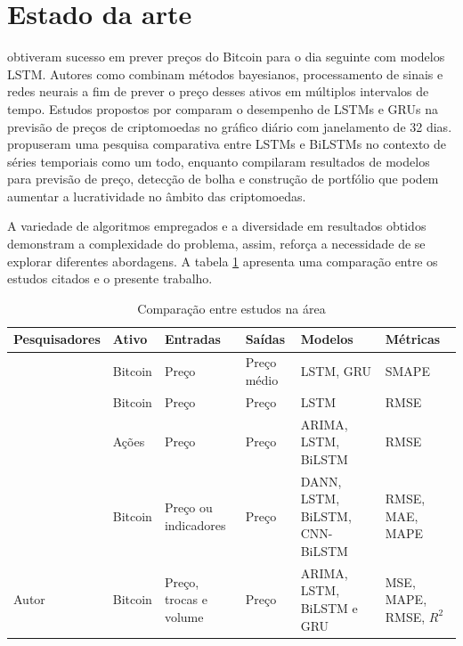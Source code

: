 
\section{Estado da arte} \label{sec:estado}

\textcite{Fer} obtiveram sucesso em prever preços do Bitcoin para o dia seguinte com modelos LSTM. Autores como \textcite{Tri} combinam métodos bayesianos, processamento de sinais e redes neurais a fim de prever o preço desses ativos em múltiplos intervalos de tempo.
Estudos propostos por \textcite{lstmvsgru} comparam o desempenho de LSTMs e GRUs na previsão de preços de criptomoedas no gráfico diário com janelamento de 32 dias.
\textcite{Siami} propuseram uma pesquisa comparativa entre LSTMs e BiLSTMs no contexto de séries temporiais como um todo, enquanto
\textcite{Zhang} compilaram resultados de modelos para previsão de preço, detecção de bolha e construção de portfólio que podem aumentar a lucratividade no âmbito das criptomoedas.

A variedade de algoritmos empregados e a diversidade em resultados obtidos demonstram a complexidade do problema, assim, reforça a necessidade de se explorar diferentes abordagens. A tabela \ref{tabela:lista_estudos} apresenta uma comparação entre os estudos citados e o presente trabalho.

\begin{table}[!htb]
  \scriptsize
  \caption{Comparação entre estudos na área} \label{tabela:lista_estudos}
  \begin{tabularx}{\textwidth}{l|X|X|X|X|X} \hline
    Pesquisadores & Ativo & Entradas & Saídas & Modelos & Métricas \\ \hline
    \cite{lstmvsgru} & Bitcoin & Preço & Preço médio & LSTM, GRU & SMAPE \\ \hline
    \cite{Fer} & Bitcoin & Preço & Preço & LSTM & RMSE \\ \hline
    \cite{Siami} & Ações & Preço & Preço& ARIMA, LSTM, BiLSTM & RMSE \\ \hline
    \cite{Tri} & Bitcoin & Preço ou indicadores& Preço & DANN, LSTM, BiLSTM, CNN-BiLSTM & RMSE, MAE, MAPE \\ \hline
    Autor & Bitcoin & Preço, trocas e volume & Preço & ARIMA, LSTM, BiLSTM e GRU & MSE, MAPE, RMSE, $R^2$ \\ \hline
  \end{tabularx}
\end{table}
